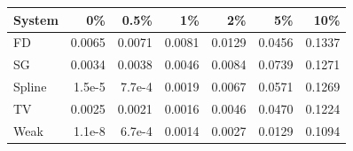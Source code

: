 \begin{tabular}{lrrrrrr}\toprule
System & 0\% & 0.5\% & 1\% & 2\% & 5\% & 10\% \\\midrule
FD & 0.0065 & 0.0071 & 0.0081 & 0.0129 & 0.0456 & 0.1337 \\
SG & 0.0034 & 0.0038 & 0.0046 & 0.0084 & 0.0739 & 0.1271 \\
Spline & 1.5e-5 & 7.7e-4 & 0.0019 & 0.0067 & 0.0571 & 0.1269 \\
TV & 0.0025 & 0.0021 & 0.0016 & 0.0046 & 0.0470 & 0.1224 \\
Weak & 1.1e-8 & 6.7e-4 & 0.0014 & 0.0027 & 0.0129 & 0.1094 \\
\bottomrule\end{tabular}
